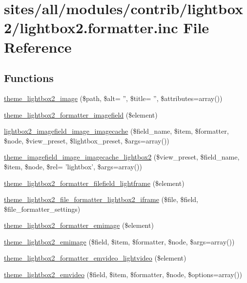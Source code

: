 \hypertarget{lightbox2_8formatter_8inc}{
\section{sites/all/modules/contrib/lightbox2/lightbox2.formatter.inc File Reference}
\label{lightbox2_8formatter_8inc}
}
\subsection*{Functions}
\begin{CompactItemize}
\item 
\hyperlink{lightbox2_8formatter_8inc_4ba8a7f504a1255b4770051408c3a7c4}{theme\_\-lightbox2\_\-image} (\$path, \$alt= '', \$title= '', \$attributes=array())
\item 
\hyperlink{lightbox2_8formatter_8inc_450372bfe4bdee2f7542e81098166703}{theme\_\-lightbox2\_\-formatter\_\-imagefield} (\$element)
\item 
\hyperlink{lightbox2_8formatter_8inc_0aa92673e347b0308d7495cff8c4a9e1}{lightbox2\_\-imagefield\_\-image\_\-imagecache} (\$field\_\-name, \$item, \$formatter, \$node, \$view\_\-preset, \$lightbox\_\-preset, \$args=array())
\item 
\hyperlink{lightbox2_8formatter_8inc_8d796df1969b3548e0c86b5e6456c1bc}{theme\_\-imagefield\_\-image\_\-imagecache\_\-lightbox2} (\$view\_\-preset, \$field\_\-name, \$item, \$node, \$rel= 'lightbox', \$args=array())
\item 
\hyperlink{lightbox2_8formatter_8inc_8721928b4c5064fea2bf2c1c150300bb}{theme\_\-lightbox2\_\-formatter\_\-filefield\_\-lightframe} (\$element)
\item 
\hyperlink{lightbox2_8formatter_8inc_502d02040486a0550fdd60f42880c90b}{theme\_\-lightbox2\_\-file\_\-formatter\_\-lightbox2\_\-iframe} (\$file, \$field, \$file\_\-formatter\_\-settings)
\item 
\hyperlink{lightbox2_8formatter_8inc_f45363655b651acac0a1a211fd1d6359}{theme\_\-lightbox2\_\-formatter\_\-emimage} (\$element)
\item 
\hyperlink{lightbox2_8formatter_8inc_61e32054133c7f64ee7504d0b69b1595}{theme\_\-lightbox2\_\-emimage} (\$field, \$item, \$formatter, \$node, \$args=array())
\item 
\hyperlink{lightbox2_8formatter_8inc_0a207276643712809de52eb7d4641b8b}{theme\_\-lightbox2\_\-formatter\_\-emvideo\_\-lightvideo} (\$element)
\item 
\hyperlink{lightbox2_8formatter_8inc_55a97c8d94f5b37a32eb1bf79c153533}{theme\_\-lightbox2\_\-emvideo} (\$field, \$item, \$formatter, \$node, \$options=array())
\end{CompactItemize}


